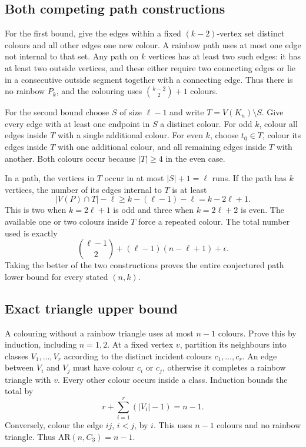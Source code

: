 \subsection*{Both competing path constructions}
For the first bound, give the edges within a fixed $(k-2)$-vertex set distinct colours and all other edges one new colour. A rainbow path uses at most one edge not internal to that set. Any path on $k$ vertices has at least two such edges: it has at least two outside vertices, and these either require two connecting edges or lie in a consecutive outside segment together with a connecting edge. Thus there is no rainbow $P_k$, and the colouring uses $\binom{k-2}{2}+1$ colours.

For the second bound choose $S$ of size $\ell-1$ and write $T=V(K_n)\setminus S$. Give every edge with at least one endpoint in $S$ a distinct colour. For odd $k$, colour all edges inside $T$ with a single additional colour. For even $k$, choose $t_0\in T$, colour its edges inside $T$ with one additional colour, and all remaining edges inside $T$ with another. Both colours occur because $|T|\ge4$ in the even case.

In a path, the vertices in $T$ occur in at most $|S|+1=\ell$ runs. If the path has $k$ vertices, the number of its edges internal to $T$ is at least
\[
 |V(P)\cap T|-\ell\ge k-(\ell-1)-\ell=k-2\ell+1.
\]
This is two when $k=2\ell+1$ is odd and three when $k=2\ell+2$ is even. The available one or two colours inside $T$ force a repeated colour. The total number used is exactly
\[
 \binom{\ell-1}{2}+(\ell-1)(n-\ell+1)+\epsilon.
\]
Taking the better of the two constructions proves the entire conjectured path lower bound for every stated $(n,k)$.

\subsection*{Exact triangle upper bound}
A colouring without a rainbow triangle uses at most $n-1$ colours. Prove this by induction, including $n=1,2$. At a fixed vertex $v$, partition its neighbours into classes $V_1,\ldots,V_r$ according to the distinct incident colours $c_1,\ldots,c_r$. An edge between $V_i$ and $V_j$ must have colour $c_i$ or $c_j$, otherwise it completes a rainbow triangle with $v$. Every other colour occurs inside a class. Induction bounds the total by
\[
 r+\sum_{i=1}^r(|V_i|-1)=n-1.
\]
Conversely, colour the edge $ij$, $i<j$, by $i$. This uses $n-1$ colours and no rainbow triangle. Thus $\mathrm{AR}(n,C_3)=n-1$.

